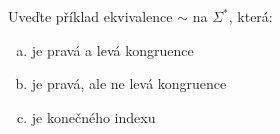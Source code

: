 \documentclass[a4paper,12pt]{amsart}
\begin{document}
\medskip\begin{problem}

    Uveďte příklad ekvivalence $\sim$ na $\Sigma^*$, která:

    \begin{enumerate}[(a)]\setlength\itemsep{6pt}
        \item je pravá a levá kongruence
        \item je pravá, ale ne levá kongruence
        \item je konečného indexu
    \end{enumerate}

\end{problem}
\end{document}
